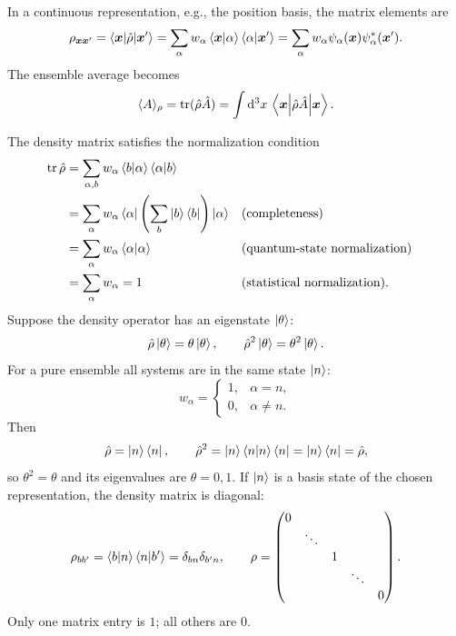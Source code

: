 In a continuous representation, e.g., the position basis, the matrix elements are
\begin{equation}
\rho_{\bm{x}\bm{x}'}=\left\langle\bm{x}\middle|\hat{\rho}\middle|\bm{x}'\right\rangle
=\sum_\alpha w_\alpha\left\langle\bm{x}\middle|\alpha\right\rangle\left\langle\alpha\middle|\bm{x}'\right\rangle
=\sum_\alpha w_\alpha\psi_\alpha(\bm{x})\psi_\alpha^*(\bm{x}').
\end{equation}
The ensemble average becomes
\begin{equation}
\langle A\rangle_\rho=\operatorname{tr}(\hat{\rho}\hat{A})
=\int\mathrm{d}^3x\,\left\langle\bm{x}\middle|\hat{\rho}\hat{A}\middle|\bm{x}\right\rangle.
\end{equation}

The density matrix satisfies the normalization condition
\begin{equation}\begin{aligned}
\operatorname{tr}\hat{\rho}
&=\sum_{\alpha,b}w_\alpha\left\langle b\middle|\alpha\right\rangle\left\langle\alpha\middle|b\right\rangle\\
&=\sum_\alpha w_\alpha\left\langle\alpha\right|\left(\sum_b\left|b\right\rangle\left\langle b\right|\right)\left|\alpha\right\rangle
&&\text{(completeness)}\\
&=\sum_\alpha w_\alpha\left\langle\alpha\middle|\alpha\right\rangle
&&\text{(quantum-state normalization)}\\
&=\sum_\alpha w_\alpha=1
&&\text{(statistical normalization)}.
\end{aligned}\end{equation}
Suppose the density operator has an eigenstate $\left|\theta\right\rangle$:
\begin{equation}
\hat{\rho}\left|\theta\right\rangle=\theta\left|\theta\right\rangle,\qquad
\hat{\rho}^2\left|\theta\right\rangle=\theta^2\left|\theta\right\rangle.
\end{equation}
For a pure ensemble all systems are in the same state $\left|n\right\rangle$:
\begin{equation}
w_\alpha=\begin{cases}1,&\alpha=n,\\0,&\alpha\ne n.\end{cases}
\end{equation}
Then
\begin{equation}
\hat{\rho}=\left|n\right\rangle\left\langle n\right|,\qquad
\hat{\rho}^2=\left|n\right\rangle\left\langle n\middle|n\right\rangle\left\langle n\right|=\left|n\right\rangle\left\langle n\right|=\hat{\rho},
\end{equation}
so $\theta^2=\theta$ and its eigenvalues are $\theta=0,1$. If $\left|n\right\rangle$ is a basis state of the chosen representation, the density matrix is diagonal:
\begin{equation}
\rho_{bb'}=\left\langle b\middle|n\right\rangle\left\langle n\middle|b'\right\rangle=\delta_{bn}\delta_{b'n},\qquad
\rho=\begin{pmatrix}0&&&&\\&\ddots&&&\\&&1&&\\&&&\ddots&\\&&&&0\end{pmatrix}.
\end{equation}
Only one matrix entry is $1$; all others are $0$.

